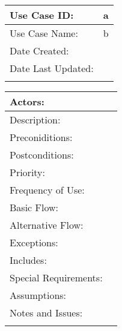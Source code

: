 \documentclass[12pt, a4paper]{article}
\begin{document}
\begin{tabular}{!{\vrule width 2pt}R{4cm}|L{11cm}!{\vrule width 2pt}}
Use Case ID: & a \\\hline
Use Case Name: & b \\\hline
Date Created: &  \\\hline
Date Last Updated: &  \\
\end{tabular}

\vspace{5mm}

\begin{tabular}{!{\vrule width 2pt}R{4cm}|L{11cm}!{\vrule width 2pt}}
Actors: &  \\\hline
Description: &  \\\hline
Preconiditions: &  \\\hline
Postconditions: &  \\\hline
Priority: &  \\\hline
Frequency of Use: &  \\\hline
Basic Flow: &  \\\hline
Alternative Flow: &  \\\hline
Exceptions: &  \\\hline
Includes: &  \\\hline
Special Requirements: &  \\\hline
Assumptions: &  \\\hline
Notes and Issues: &  \\
\end{tabular}
\end{document}
